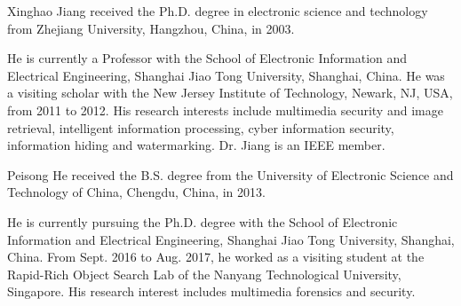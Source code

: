 \documentclass[journal,sort]{IEEEtran}
\begin{document}


\begin{IEEEbiography}{Xinghao Jiang}
	received the Ph.D. degree in electronic science and technology from Zhejiang University, Hangzhou, China, in 2003.
	
	He is currently a Professor with the School of Electronic Information and Electrical Engineering, Shanghai Jiao Tong University, Shanghai, China. He was a visiting scholar with the New Jersey Institute of Technology, Newark, NJ, USA, from 2011 to 2012.  His research interests include multimedia security and image retrieval, intelligent information processing, cyber information security, information hiding and watermarking. Dr. Jiang is an IEEE member.
\end{IEEEbiography}

\begin{IEEEbiography}{Peisong He}
	received the B.S. degree from the University of Electronic Science and Technology of China, Chengdu, China, in 2013.
	
	He is currently pursuing the Ph.D. degree with the School of Electronic Information and Electrical Engineering, Shanghai Jiao Tong University, Shanghai, China. From Sept. 2016 to Aug. 2017, he worked as a visiting student at the Rapid-Rich Object Search Lab of the Nanyang Technological University, Singapore. His research interest includes multimedia forensics and security.
\end{IEEEbiography}
\end{document}
